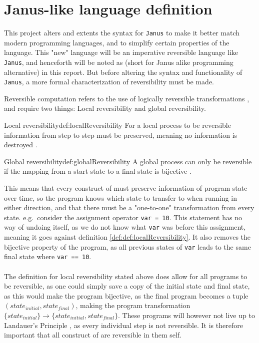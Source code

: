 \section{Janus-like language definition} \label{sec:language-def}
This project alters and extents the syntax for \texttt{Janus} to make it better match modern
programming languages, and to simplify certain properties of the language.
This "new" language will be an imperative reversible language like
\texttt{Janus}, and henceforth will be noted as \lan
(short for Janus alike programming alternative) in this report.
But before altering the syntax and functionality of \texttt{Janus}, a more formal characterization
of reversibility must be made.

Reversible computation refers to the use of logically reversible transformations \cite{ARTICLE:2},
and require two things: Local reversibility and global reversibility.

\begin{myDefinition}{Local reversibility}{def:localReversibility}
For a local process to be reversible information from step to step must be preserved, meaning no
information is destroyed \cite{ARTICLE:1}.
\end{myDefinition}

\begin{myDefinition}{Global reversibility}{def:globalReversibility}
A global process can only be reversible if the mapping from a start state to a final state is
bijective \cite{ARTICLE:1}. 
\end{myDefinition}
\noindent
This means that every construct of \lan must preserve information of program state over time, so
the program knows which state to transfer to when running in either direction, and that there
must be a "one-to-one" transformation from every state. e.g.\ consider the assignment
operator \texttt{var = 10}. This statement has no way of undoing itself, as we do not know what
\texttt{var} was before this assignment, meaning it goes against definition
\ref{def:def:localReversibility}. It also removes the bijective property of the program, as
all previous states of \texttt{var} leads to the same final state where \texttt{var == 10}.
\\
\\
The definition for local reversibility stated above does allow for all programs to be reversible,
as one could simply save a copy of the initial state and final state, as this would make
the program bijective, as the final program becomes a tuple $(state_{initial}, state_{final})$,
making the program transformation $\{state_{initial}\} \to \{state_{initial}, state_{final}\}$.
These programs will however not live up to Landauer's Principle \cite{article:3}, as every
individual step is not reversible. It is therefore important that all construct of \lan are
reversible in them self.

